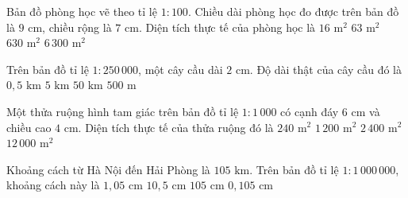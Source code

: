 \begin{ex} %
Bản đồ phòng học vẽ theo tỉ lệ $1 : 100$. Chiều dài phòng học đo được trên bản đồ là $9\text{ cm}$, chiều rộng là $7\text{ cm}$. Diện tích thực tế của phòng học là
\choice
{$16\text{ m}^2$}
{\True $63\text{ m}^2$}
{$630\text{ m}^2$}
{$6\,300\text{ m}^2$}
\end{ex}

\begin{ex} %
Trên bản đồ tỉ lệ $1 : 250\,000$, một cây cầu dài $2\text{ cm}$. Độ dài thật của cây cầu đó là
\choice
{$0{,}5\text{ km}$}
{\True $5\text{ km}$}
{$50\text{ km}$}
{$500\text{ m}$}
\end{ex}

\begin{ex} %
Một thửa ruộng hình tam giác trên bản đồ tỉ lệ $1 : 1\,000$ có cạnh đáy $6\text{ cm}$ và chiều cao $4\text{ cm}$. Diện tích thực tế của thửa ruộng đó là
\choice
{$240\text{ m}^2$}
{\True $1\,200\text{ m}^2$}
{$2\,400\text{ m}^2$}
{$12\,000\text{ m}^2$}
\end{ex}

\begin{ex} %
Khoảng cách từ Hà Nội đến Hải Phòng là $105\text{ km}$. Trên bản đồ tỉ lệ $1 : 1\,000\,000$, khoảng cách này là
\choice
{$1{,}05\text{ cm}$}
{\True $10{,}5\text{ cm}$}
{$105\text{ cm}$}
{$0{,}105\text{ cm}$}
\end{ex}

